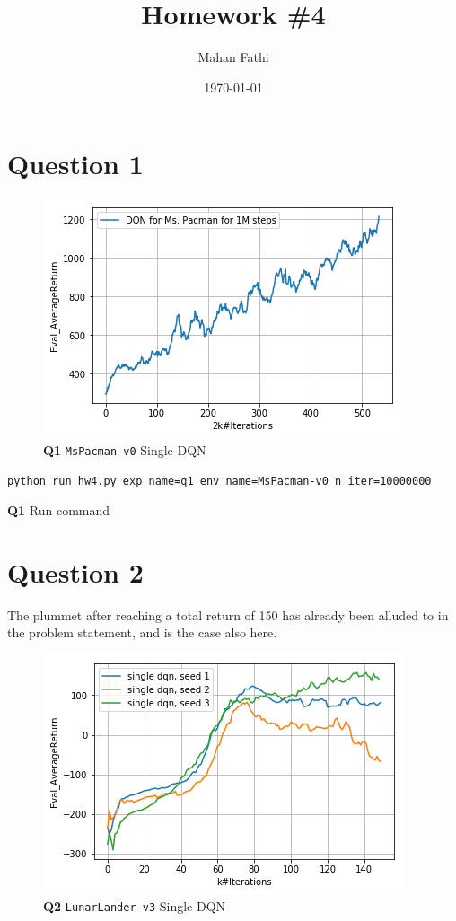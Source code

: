 \documentclass[11pt]{article}
\author{Mahan Fathi}
\date{\today}
\title{\textbf{Homework \#4}}
\begin{document}
\maketitle
\clearpage

\section{Question 1}
\label{sec:orgf55f7cf}

\begin{figure}[htbp]
\centering
\includegraphics[width=.9\linewidth]{./1.png}
\caption{\textbf{Q1} \texttt{MsPacman-v0} Single DQN}
\end{figure}

\begin{listing}[htbp]
\begin{verbatim}
python run_hw4.py exp_name=q1 env_name=MsPacman-v0 n_iter=10000000
\end{verbatim}
\caption{\textbf{Q1} Run command}
\end{listing}

\clearpage

\section{Question 2}
\label{sec:org87869f4}
The plummet after reaching a total return of 150 has already been alluded to in the problem statement, and is the case also here.

\begin{figure}[htbp]
\centering
\includegraphics[width=.9\linewidth]{./21.png}
\caption{\textbf{Q2} \texttt{LunarLander-v3} Single DQN}
\end{figure}
\end{document}
